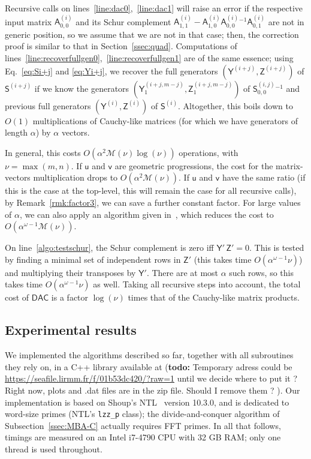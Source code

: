 \documentclass[sigconf]{acmart}
\newcommand{\vu}{\ensuremath{\mathsf{u}}}
\newcommand{\vv}{\ensuremath{\mathsf{v}}}
\newcommand{\mA}{\ensuremath{\mathsf{A}}}
\newcommand{\mS}{\ensuremath{\mathsf{S}}}
\newcommand{\mY}{\ensuremath{\mathsf{Y}}}
\newcommand{\mZ}{\ensuremath{\mathsf{Z}}}
\newcommand{\M}{\ensuremath{\mathscr{M}}}
\newcommand{\mx}{\ensuremath{\nu}}
\newcommand{\DACp}{\ensuremath{\mathsf{DAC}}}
\newcommand{\todo}[1]{(\textbf{todo:} #1)}
\theoremstyle{acmdefinition}
\begin{document}
Recursive calls on lines~\ref{line:dac0},~\ref{line:dac1}
will raise an error if the respective input matrix
${\mA^{(i)}_{0,0}}$ and its Schur complement $\mA^{(i)}_{1,1} -
\mA^{(i)}_{1,0} {\mA^{(i)}_{0,0}}{}^{-1} \mA^{(i)}_{0,1}$ are not in
generic position, so we assume that we are not in that case; then, the
correction proof is similar to that in Section~\ref{ssec:quad}.
Computations of
lines~\ref{line:recoverfullgen0},~\ref{line:recoverfullgen1} are of
the same essence; using Eq.~\eqref{eq:Si+j} and \eqref{eq:Yi+j}, we
recover the full generators $(\mY^{(i+j)},\mZ^{(i+j)})$ of
$\mS^{(i+j)}$ if we know the generators
$(\mY^{(i+j,m-j)}_1,\mZ^{(i+j,m-j)}_1)$ of $\mS^{(i,j)}_{0,0}{}^{-1}$
and previous full generators $(\mY^{(i)},\mZ^{(i)})$ of $\mS^{(i)}$.
Altogether, this boils down to $O(1)$ multiplications of Cauchy-like
matrices (for which we have generators of length $\alpha$) 
by $\alpha$ vectors.

In general, this costs $O(\alpha^2 \M(\mx) \log(\mx))$
operations, with $\mx=\max(m,n)$. If $\vu$ and $\vv$ are 
geometric progressions, the cost for the matrix-vectors multiplication
drops to $O(\alpha^2 \M(\mx))$. If $\vu$ and $\vv$ have the same ratio
(if this is the case at the top-level, this will remain the case for
all recursive calls),  by Remark~\ref{rmk:factor3}, we can save
a further constant factor.  For large values of $\alpha$, we
can also apply an algorithm given in~\cite{BoJeMoSc16}, which reduces the
cost to $O(\alpha^{\omega-1} \M(\mx))$.

On line~\ref{algo:testschur}, the Schur complement is zero iff
$\mY'\, \mZ' = 0$. This is tested by finding a minimal set of
independent rows in $\mZ'$ (this takes time
$O(\alpha^{\omega-1} \mx)$) and multiplying their transposes by
${\mY'}$. There are at most $\alpha$ such rows, so this takes time
$O(\alpha^{\omega-1} \mx)$ as well.  Taking all recursive steps into
account, the total cost of $\DACp$ is a factor $\log(\mx)$ times that
of the Cauchy-like matrix products.


\vspace{-5px}
\subsection{Experimental results}

We implemented the algorithms described so far, together with all
subroutines they rely on, in a C++ library available at
\todo{Temporary adress could be
  \url{https://seafile.lirmm.fr/f/01b53dc420/?raw=1} until we decide
  where to put it ? Right now, plots and .dat files are in the zip
  file. Should I remove them ? }. Our implementation is based on
Shoup's NTL~\cite{Shoup95,NTL} version 10.3.0, and is dedicated to
word-size primes (NTL's \texttt{lzz\_p} class); the divide-and-conquer
algorithm of Subsection~\ref{ssec:MBA-C} actually requires FFT primes.
In all that follows, timings are measured on an Intel i7-4790 CPU with
32 GB RAM; only one thread is used throughout.
\end{document}
